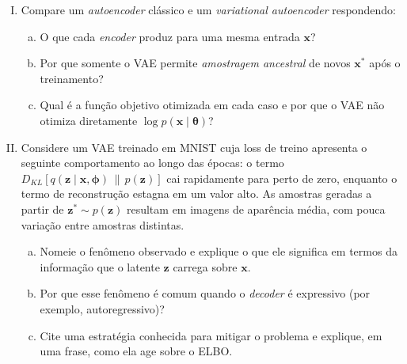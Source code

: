 \documentclass{dlproblemset}
\newcommand{\thetav}{\boldsymbol{\theta}}
\begin{document}
\begin{enumerate}[I)]
    \item Compare um \textit{autoencoder} clássico e um \textit{variational autoencoder} respondendo:
    \begin{enumerate}[(a)]
        \item O que cada \textit{encoder} produz para uma mesma entrada $\mathbf{x}$?
        \item Por que somente o VAE permite \emph{amostragem ancestral} de novos $\mathbf{x}^{*}$ após o treinamento?
        \item Qual é a função objetivo otimizada em cada caso e por que o VAE não otimiza diretamente $\log p(\mathbf{x} \mid \thetav)$?
    \end{enumerate}

    \item Considere um VAE treinado em MNIST cuja loss de treino apresenta o seguinte comportamento ao longo das épocas: o termo $D_{KL}\!\left[q(\mathbf{z} \mid \mathbf{x}, \boldsymbol{\phi})\,\|\,p(\mathbf{z})\right]$ cai rapidamente para perto de zero, enquanto o termo de reconstrução estagna em um valor alto. As amostras geradas a partir de $\mathbf{z}^{*} \sim p(\mathbf{z})$ resultam em imagens de aparência média, com pouca variação entre amostras distintas.
    \begin{enumerate}[(a)]
        \item Nomeie o fenômeno observado e explique o que ele significa em termos da informação que o latente $\mathbf{z}$ carrega sobre $\mathbf{x}$.
        \item Por que esse fenômeno é comum quando o \textit{decoder} é expressivo (por exemplo, autoregressivo)?
        \item Cite uma estratégia conhecida para mitigar o problema e explique, em uma frase, como ela age sobre o ELBO.
    \end{enumerate}



\end{enumerate}
\end{document}
